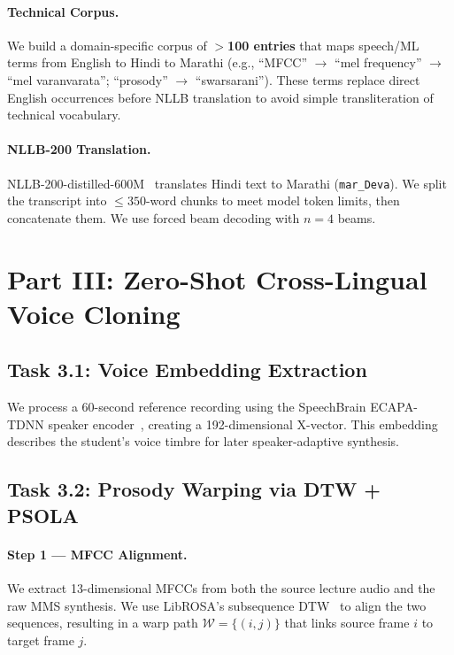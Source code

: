 \documentclass[10pt,twocolumn,letterpaper]{article}
\begin{document}
\paragraph{Technical Corpus.} We build a domain-specific corpus of \textbf{$>$100 entries} that maps speech/ML terms from English to Hindi to Marathi (e.g., “MFCC” $\to$ “mel frequency” $\to$ “mel varanvarata”; “prosody” $\to$ “swarsarani”). These terms replace direct English occurrences before NLLB translation to avoid simple transliteration of technical vocabulary.

\paragraph{NLLB-200 Translation.} NLLB-200-distilled-600M~\cite{costa2022no} translates Hindi text to Marathi (\texttt{mar\_Deva}). We split the transcript into $\leq\!350$-word chunks to meet model token limits, then concatenate them. We use forced beam decoding with $n{=}4$ beams.

\section{Part III: Zero-Shot Cross-Lingual Voice Cloning}
\label{sec:part3}

\subsection{Task 3.1: Voice Embedding Extraction}

We process a 60-second reference recording using the SpeechBrain ECAPA-TDNN speaker encoder~\cite{desplanques2020ecapa}, creating a 192-dimensional X-vector. This embedding describes the student's voice timbre for later speaker-adaptive synthesis.

\subsection{Task 3.2: Prosody Warping via DTW + PSOLA}

\paragraph{Step 1 — MFCC Alignment.} We extract 13-dimensional MFCCs from both the source lecture audio and the raw MMS synthesis. We use LibROSA's subsequence DTW~\cite{librosa} to align the two sequences, resulting in a warp path $\mathcal{W} = \{(i, j)\}$ that links source frame $i$ to target frame $j$.
\end{document}
